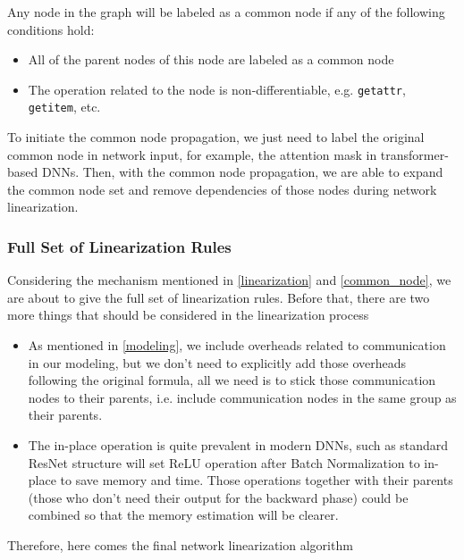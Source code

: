 \begin{lemma}
    Any node in the graph will be labeled as a common node if any of the following conditions hold:

    \begin{itemize}
        \item All of the parent nodes of this node are labeled as a common node
        \item The operation related to the node is non-differentiable, e.g. \texttt{getattr}, \texttt{getitem}, etc.
    \end{itemize}
    \label{lem:cnodeprop}
\end{lemma}

To initiate the common node propagation, we just need to label the original common node in network input, for example, the attention mask in transformer-based DNNs. Then, with the common node propagation, we are able to expand the common node set and remove dependencies of those nodes during network linearization.

\subsubsection{Full Set of Linearization Rules}

Considering the mechanism mentioned in \ref{linearization} and \ref{common_node}, we are about to give the full set of linearization rules. Before that, there are two more things that should be considered in the linearization process

\begin{itemize}
    \item As mentioned in \ref{modeling}, we include overheads related to communication in our modeling, but we don't need to explicitly add those overheads following the original formula, all we need is to stick those communication nodes to their parents, i.e. include communication nodes in the same group as their parents.
   \item The in-place operation is quite prevalent in modern DNNs, such as standard ResNet structure will set ReLU operation after Batch Normalization to in-place to save memory and time. Those operations together with their parents (those who don't need their output for the backward phase) could be combined so that the memory estimation will be clearer.
\end{itemize}

Therefore, here comes the final network linearization algorithm

